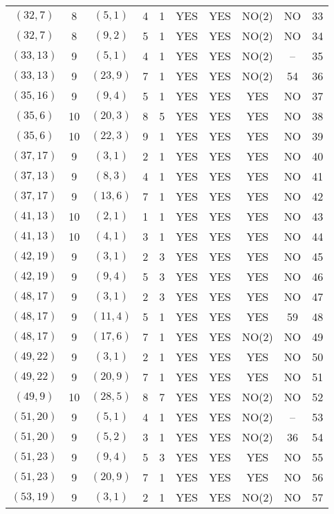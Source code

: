 \begin{longtable}{|c|c|c|c|c|c|c|c|c|c|}
$(32, 7)$ & 8 & $(5, 1)$ & 4 & 1 & YES & YES & NO(2) & NO & 33\\
$(32, 7)$ & 8 & $(9, 2)$ & 5 & 1 & YES & YES & NO(2) & NO & 34\\
$(33, 13)$ & 9 & $(5, 1)$ & 4 & 1 & YES & YES & NO(2) & -- & 35\\
$(33, 13)$ & 9 & $(23, 9)$ & 7 & 1 & YES & YES & NO(2) & 54 & 36\\
$(35, 16)$ & 9 & $(9, 4)$ & 5 & 1 & YES & YES & YES & NO & 37\\
$(35, 6)$ & 10 & $(20, 3)$ & 8 & 5 & YES & YES & YES & NO & 38\\
$(35, 6)$ & 10 & $(22, 3)$ & 9 & 1 & YES & YES & YES & NO & 39\\
$(37, 17)$ & 9 & $(3, 1)$ & 2 & 1 & YES & YES & YES & NO & 40\\
$(37, 13)$ & 9 & $(8, 3)$ & 4 & 1 & YES & YES & YES & NO & 41\\
$(37, 17)$ & 9 & $(13, 6)$ & 7 & 1 & YES & YES & YES & NO & 42\\
$(41, 13)$ & 10 & $(2, 1)$ & 1 & 1 & YES & YES & YES & NO & 43\\
$(41, 13)$ & 10 & $(4, 1)$ & 3 & 1 & YES & YES & YES & NO & 44\\
$(42, 19)$ & 9 & $(3, 1)$ & 2 & 3 & YES & YES & YES & NO & 45\\
$(42, 19)$ & 9 & $(9, 4)$ & 5 & 3 & YES & YES & YES & NO & 46\\
$(48, 17)$ & 9 & $(3, 1)$ & 2 & 3 & YES & YES & YES & NO & 47\\
$(48, 17)$ & 9 & $(11, 4)$ & 5 & 1 & YES & YES & YES & 59 & 48\\
$(48, 17)$ & 9 & $(17, 6)$ & 7 & 1 & YES & YES & NO(2) & NO & 49\\
$(49, 22)$ & 9 & $(3, 1)$ & 2 & 1 & YES & YES & YES & NO & 50\\
$(49, 22)$ & 9 & $(20, 9)$ & 7 & 1 & YES & YES & YES & NO & 51\\
$(49, 9)$ & 10 & $(28, 5)$ & 8 & 7 & YES & YES & NO(2) & NO & 52\\
$(51, 20)$ & 9 & $(5, 1)$ & 4 & 1 & YES & YES & NO(2) & -- & 53\\
$(51, 20)$ & 9 & $(5, 2)$ & 3 & 1 & YES & YES & NO(2) & 36 & 54\\
$(51, 23)$ & 9 & $(9, 4)$ & 5 & 3 & YES & YES & YES & NO & 55\\
$(51, 23)$ & 9 & $(20, 9)$ & 7 & 1 & YES & YES & YES & NO & 56\\
$(53, 19)$ & 9 & $(3, 1)$ & 2 & 1 & YES & YES & NO(2) & NO & 57\\

\end{longtable}
